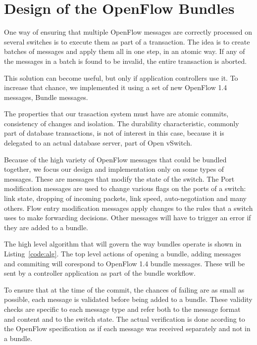 \chapter{Design of the OpenFlow Bundles}
\label{chapter:architecture}  

One way of ensuring that multiple OpenFlow messages are correctly processed on several switches
is to execute them as part of a transaction. The idea is to create batches of messages and apply them
all in one step, in an atomic way. If any of the messages in a batch is found to be invalid, the entire
transaction is aborted.

This solution can become useful, but only if application controllers use it. To increase that chance, we
implemented it using a set of new OpenFlow 1.4 messages, Bundle messages.

The properties that our trasaction system must have are atomic commits, consistency of changes and isolation.
The durability characteristic, commonly part of database transactions, is not of interest in this case, because
it is delegated to an actual database server, part of Open vSwitch.

Because of the high variety of OpenFlow messages that could be bundled together, we focus our design
and implementation only on some types of messages. These are messages that modify the state of the switch.
The Port modification messages are used to change various flags on the ports of a switch: link state,
dropping of incoming packets, link speed, auto-negotiation and many others. Flow entry modification messages
apply changes to the rules that a switch uses to make forwarding decisions. Other messages will have to
trigger an error if they are added to a bundle.

The high level algorithm that will govern the way bundles operate is shown in Listing~\ref{code:alg}. The top
level actions of opening a bundle, adding messages and commiting will corespond to OpenFlow 1.4 bundle messages.
These will be sent by a controller application as part of the bundle workflow.

To ensure that at the time of the commit, the chances of failing are as small as possible, each message
is validated before being added to a bundle. These validity checks are specific to each message type and refer
both to the message format and content and to the switch state. The actual verification is done acording to
the OpenFlow specification as if each message was received separately and not in a bundle.

